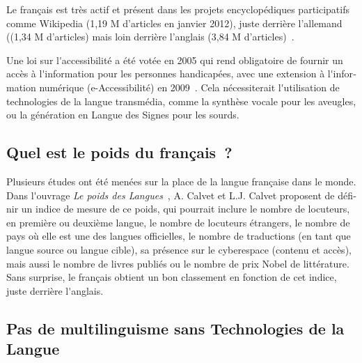 \begin{french}
\begin{multicols}{2}
Le français est très actif et présent dans les projets encyclopédiques participatifs comme Wikipedia (1,19 M d'articles en janvier 2012), juste derrière l'allemand ((1,34 M d'articles) mais loin derrière l'anglais (3,84 M d'articles)~\cite{wikipediastats}.

Une loi sur l{\mbox '}accessibilité a été votée en 2005 qui rend
obligatoire de fournir un accès à l{\mbox '}information pour les
personnes handicapées, avec une extension à l{\mbox '}information
numérique (e-Accessibilité) en 2009~\cite{loi}. Cela nécessiterait
l{\mbox '}utilisation de technologies de la langue transmédia, comme
la synthèse vocale pour les aveugles, ou la génération en Langue des
Signes pour les sourds.

\subsection{Quel est le poids du français~?}

Plusieurs études ont été menées sur la place de la langue française
dans le monde. Dans l{\mbox '}ouvrage {\em Le poids des
  Langues}~\cite{calvet09}, A. Calvet et L.J. Calvet proposent de
définir un indice de mesure de ce poids, qui pourrait inclure le
nombre de locuteurs, en première ou deuxième langue, le nombre de
locuteurs étrangers, le nombre de pays où elle est une des langues
officielles, le nombre de traductions (en tant que langue source ou
langue cible), sa présence sur le cyberespace (contenu et accès), mais
aussi le nombre de livres publiés ou le nombre de prix Nobel de
littérature. Sans surprise, le français obtient un bon classement en
fonction de cet indice, juste derrière l{\mbox '}anglais.

\subsection{Pas de multilinguisme sans Technologies de la Langue}


\end{multicols}
\end{french}
